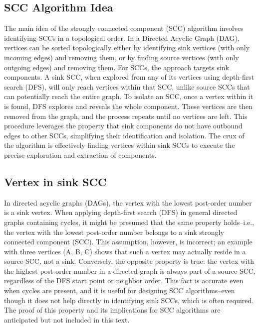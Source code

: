 \subsection*{SCC Algorithm Idea}
The main idea of the strongly connected component (SCC) algorithm involves identifying SCCs in a topological order.
In a Directed Acyclic Graph (DAG), vertices can be sorted topologically either by identifying sink vertices (with only incoming edges) and removing them, or by finding source vertices (with only outgoing edges) and removing them.
For SCCs, the approach targets sink components.
A sink SCC, when explored from any of its vertices using depth-first search (DFS), will only reach vertices within that SCC, unlike source SCCs that can potentially reach the entire graph.
To isolate an SCC, once a vertex within it is found, DFS explores and reveals the whole component.
These vertices are then removed from the graph, and the process repeats until no vertices are left.
This procedure leverages the property that sink components do not have outbound edges to other SCCs, simplifying their identification and isolation.
The crux of the algorithm is effectively finding vertices within sink SCCs to execute the precise exploration and extraction of components.

\subsection*{Vertex in sink SCC}
In directed acyclic graphs (DAGs), the vertex with the lowest post-order number is a sink vertex.
When applying depth-first search (DFS) in general directed graphs containing cycles, it might be presumed that the same property holds--i.e., the vertex with the lowest post-order number belongs to a sink strongly connected component (SCC).
This assumption, however, is incorrect; an example with three vertices (A, B, C) shows that such a vertex may actually reside in a source SCC, not a sink.
Conversely, the opposite property is true: the vertex with the highest post-order number in a directed graph is always part of a source SCC, regardless of the DFS start point or neighbor order.
This fact is accurate even when cycles are present, and it is useful for designing SCC algorithms--even though it does not help directly in identifying sink SCCs, which is often required.
The proof of this property and its implications for SCC algorithms are anticipated but not included in this text.

